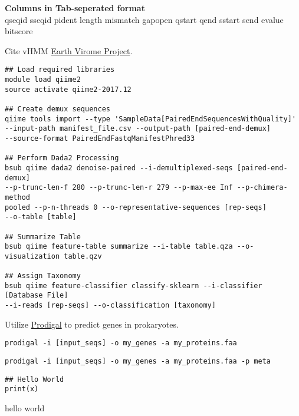 \documentclass[idxtotoc,hyperref,openany,oneside]{labbook} %
\begin{document}
\textbf{Columns in Tab-seperated format} \\
qseqid  sseqid  pident  length  mismatch  gapopen qstart  qend  sstart  send  evalue  bitscore


Cite vHMM \href{http://portal.nersc.gov/dna/microbial/prokpubs/EarthVirome_DP/}{Earth Virome Project}. 

\begin{verbatim}
## Load required libraries
module load qiime2
source activate qiime2-2017.12

## Create demux sequences
qiime tools import --type 'SampleData[PairedEndSequencesWithQuality]' 
--input-path manifest_file.csv --output-path [paired-end-demux] 
--source-format PairedEndFastqManifestPhred33

## Perform Dada2 Processing 
bsub qiime dada2 denoise-paired --i-demultiplexed-seqs [paired-end-demux]
--p-trunc-len-f 280 --p-trunc-len-r 279 --p-max-ee Inf --p-chimera-method 
pooled --p-n-threads 0 --o-representative-sequences [rep-seqs] 
--o-table [table]

## Summarize Table
bsub qiime feature-table summarize --i-table table.qza --o-visualization table.qzv

## Assign Taxonomy
bsub qiime feature-classifier classify-sklearn --i-classifier [Database File]
--i-reads [rep-seqs] --o-classification [taxonomy]
\end{verbatim}



Utilize \href{https://github.com/hyattpd/Prodigal}{Prodigal} to predict genes in prokaryotes.


\begin{verbatim}
prodigal -i [input_seqs] -o my_genes -a my_proteins.faa
\end{verbatim} 


\begin{verbatim}
prodigal -i [input_seqs] -o my_genes -a my_proteins.faa -p meta
\end{verbatim} 

\begin{lstlisting}
## Hello World 
print(x)
\end{lstlisting} 



hello world
\end{document}
